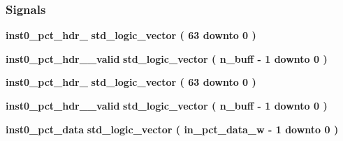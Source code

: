 \subsubsection*{Signals}
 \begin{DoxyCompactItemize}
\item 
{\bf inst0\+\_\+pct\+\_\+hdr\+\_} {\bfseries \textcolor{comment}{std\+\_\+logic\+\_\+vector}\textcolor{vhdlchar}{ }\textcolor{vhdlchar}{(}\textcolor{vhdlchar}{ }\textcolor{vhdlchar}{ } \textcolor{vhdldigit}{63} \textcolor{vhdlchar}{ }\textcolor{keywordflow}{downto}\textcolor{vhdlchar}{ }\textcolor{vhdlchar}{ } \textcolor{vhdldigit}{0} \textcolor{vhdlchar}{ }\textcolor{vhdlchar}{)}\textcolor{vhdlchar}{ }} 
\item 
{\bf inst0\+\_\+pct\+\_\+hdr\+\_\+\_\+valid} {\bfseries \textcolor{comment}{std\+\_\+logic\+\_\+vector}\textcolor{vhdlchar}{ }\textcolor{vhdlchar}{(}\textcolor{vhdlchar}{ }\textcolor{vhdlchar}{ }\textcolor{vhdlchar}{ }\textcolor{vhdlchar}{ }{\bfseries {\bf n\+\_\+buff}} \textcolor{vhdlchar}{-\/}\textcolor{vhdlchar}{ } \textcolor{vhdldigit}{1} \textcolor{vhdlchar}{ }\textcolor{keywordflow}{downto}\textcolor{vhdlchar}{ }\textcolor{vhdlchar}{ } \textcolor{vhdldigit}{0} \textcolor{vhdlchar}{ }\textcolor{vhdlchar}{)}\textcolor{vhdlchar}{ }} 
\item 
{\bf inst0\+\_\+pct\+\_\+hdr\+\_} {\bfseries \textcolor{comment}{std\+\_\+logic\+\_\+vector}\textcolor{vhdlchar}{ }\textcolor{vhdlchar}{(}\textcolor{vhdlchar}{ }\textcolor{vhdlchar}{ } \textcolor{vhdldigit}{63} \textcolor{vhdlchar}{ }\textcolor{keywordflow}{downto}\textcolor{vhdlchar}{ }\textcolor{vhdlchar}{ } \textcolor{vhdldigit}{0} \textcolor{vhdlchar}{ }\textcolor{vhdlchar}{)}\textcolor{vhdlchar}{ }} 
\item 
{\bf inst0\+\_\+pct\+\_\+hdr\+\_\+\_\+valid} {\bfseries \textcolor{comment}{std\+\_\+logic\+\_\+vector}\textcolor{vhdlchar}{ }\textcolor{vhdlchar}{(}\textcolor{vhdlchar}{ }\textcolor{vhdlchar}{ }\textcolor{vhdlchar}{ }\textcolor{vhdlchar}{ }{\bfseries {\bf n\+\_\+buff}} \textcolor{vhdlchar}{-\/}\textcolor{vhdlchar}{ } \textcolor{vhdldigit}{1} \textcolor{vhdlchar}{ }\textcolor{keywordflow}{downto}\textcolor{vhdlchar}{ }\textcolor{vhdlchar}{ } \textcolor{vhdldigit}{0} \textcolor{vhdlchar}{ }\textcolor{vhdlchar}{)}\textcolor{vhdlchar}{ }} 
\item 
{\bf inst0\+\_\+pct\+\_\+data} {\bfseries \textcolor{comment}{std\+\_\+logic\+\_\+vector}\textcolor{vhdlchar}{ }\textcolor{vhdlchar}{(}\textcolor{vhdlchar}{ }\textcolor{vhdlchar}{ }\textcolor{vhdlchar}{ }\textcolor{vhdlchar}{ }{\bfseries {\bf in\+\_\+pct\+\_\+data\+\_\+w}} \textcolor{vhdlchar}{-\/}\textcolor{vhdlchar}{ } \textcolor{vhdldigit}{1} \textcolor{vhdlchar}{ }\textcolor{keywordflow}{downto}\textcolor{vhdlchar}{ }\textcolor{vhdlchar}{ } \textcolor{vhdldigit}{0} \textcolor{vhdlchar}{ }\textcolor{vhdlchar}{)}\textcolor{vhdlchar}{ }} 

\end{DoxyCompactItemize}
